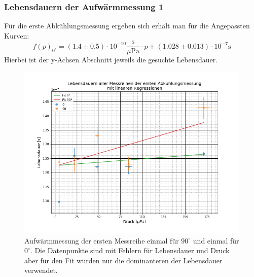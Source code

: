 \subsubsection{Lebensdauern der Aufwärmmessung 1}
Für die erste Abkühlungsmessung ergeben sich erhält man für die Angepassten Kurven:
\begin{equation*}
f(p)_{0^\circ}=(1.4\pm 0.5)\cdot 10^{-10} \frac{\text{s}}{\text{$\mu$Pa}}\cdot p + (1.028\pm 0.013)\cdot 10^{-7} \text{s}
\end{equation*}
Hierbei ist der y-Achsen Abschnitt jeweils die gesuchte Lebensdauer.
\begin{figure}[ht]
	\includegraphics[scale=0.5]{Bild/Abk1}
	\centering
	\caption[Druck zu Lebensdauer Fit für Aufwärmung]{Aufwärmmessung der ersten Messreihe einmal für $90^\circ$ und einmal für $0^\circ$. Die Datenpunkte sind mit Fehlern für Lebensdauer und Druck aber für den Fit wurden nur die dominanteren der Lebensdauer verwendet.}
	\label{Auf1}
\end{figure}
\FloatBarrier
